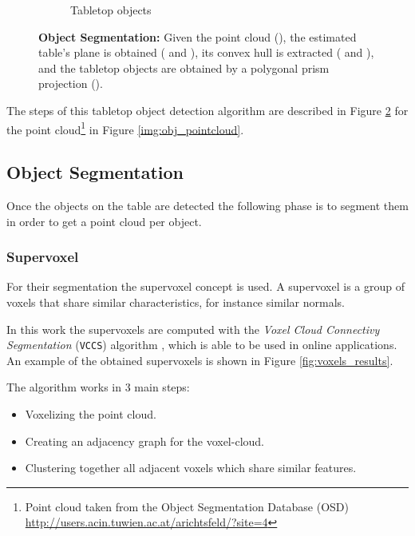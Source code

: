 \begin{figure}[tb]
\begin{subfigure}[t]{0.32\textwidth}
\caption{Tabletop objects}\label{img:obj_tabletop_objects_results}
\end{subfigure}
\caption{\textbf{Object Segmentation:} Given the point cloud (), the estimated table's plane is obtained ( and ), its convex hull is extracted ( and ), and the tabletop objects are obtained by a polygonal prism projection ().}
\label{img:obj_tabletop_objects}
\end{figure}

The steps of this tabletop object detection algorithm are described in Figure \ref{img:obj_tabletop_objects}   for the point cloud\footnote{Point cloud taken from the Object Segmentation Database (OSD) \href{http://users.acin.tuwien.ac.at/arichtsfeld/?site=4}{http://users.acin.tuwien.ac.at/arichtsfeld/?site=4}} in Figure \ref{img:obj_pointcloud}.

\subsection{Object Segmentation}
\label{sec:obj_seg}
Once the objects on the table are detected the following phase is to segment them in order to get a point cloud per object.

\subsubsection{Supervoxel}

For their segmentation the supervoxel concept is used. A supervoxel is a group of voxels that share similar characteristics, for instance similar normals.

In this work the supervoxels are computed with the \textit{Voxel Cloud Connectivy Segmentation} (\texttt{VCCS}) algorithm \cite{Papon13CVPR}, which is able to be used in online applications. An example of the obtained supervoxels is shown in Figure \ref{fig:voxels_results}.

The algorithm works in 3 main steps:
\begin{itemize}
\item Voxelizing the point cloud.
\item Creating an adjacency graph for the voxel-cloud.
\item Clustering together all adjacent voxels which share similar features.
\end{itemize} 


